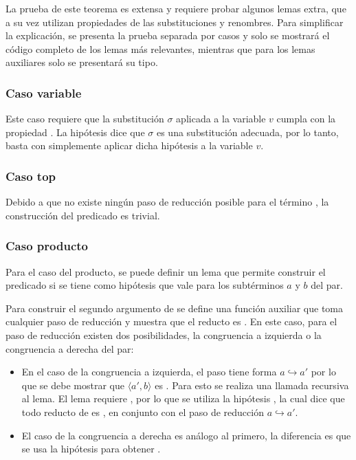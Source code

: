 
La prueba de este teorema es extensa y requiere probar algunos lemas extra, que a su vez utilizan propiedades de las substituciones y renombres.
Para simplificar la explicación, se presenta la prueba separada por casos y solo se mostrará el código completo de los lemas más relevantes, mientras que para los lemas auxiliares solo se presentará su tipo.

\subsubsection{Caso variable}

Este caso requiere que la substitución $\sigma$ aplicada a la variable $v$ cumpla con la propiedad
\snstar.
La hipótesis dice que $\sigma$ es una substitución adecuada, por lo tanto, basta con simplemente aplicar dicha hipótesis a la variable $v$.


\subsubsection{Caso top}

Debido a que no existe ningún paso de reducción posible para el término \const{$\star$}, la construcción del predicado es trivial.


\subsubsection{Caso producto}

Para el caso del producto, se puede definir un lema que permite construir el predicado si se tiene como hipótesis que \snstar vale para los subtérminos $a$ y $b$ del par.


Para construir el segundo argumento de  se define una función auxiliar  que toma cualquier paso de reducción y muestra que el reducto es \snstar.
En este caso, para el paso de reducción  existen dos posibilidades, la congruencia a izquierda o la congruencia a derecha del par:
\begin{itemize}
	\item En el caso de la congruencia a izquierda, el paso  tiene forma $a \hookrightarrow a'$ por lo que se debe mostrar que $\langle a', b \rangle$ es \snstar.
	Para esto se realiza una llamada recursiva al lema.
	El lema requiere \snstar {}, por lo que se utiliza la hipótesis , la cual dice que todo reducto de  es \snstar, en conjunto con el paso de reducción $a \hookrightarrow a'$.
	\item El caso de la congruencia a derecha es análogo al primero, la diferencia es que se usa la hipótesis  para obtener \snstar {}.
\end{itemize}

